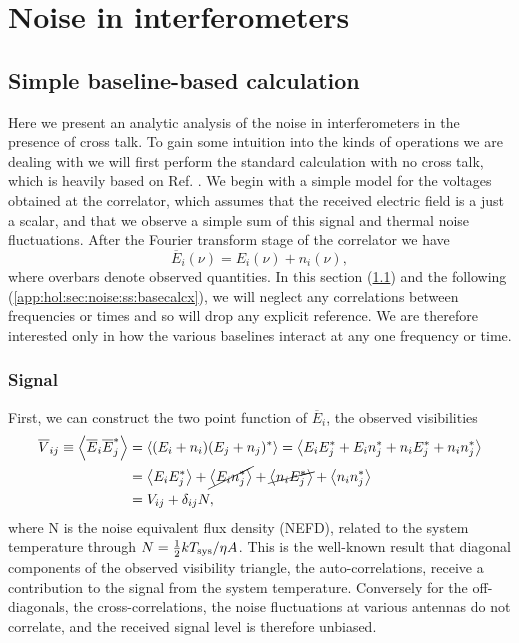 \section{Noise in interferometers}
\label{app:hol:sec:noise}

\subsection{Simple baseline-based calculation} 
\label{app:hol:sec:noise:ss:basecalc}

Here we present an analytic analysis of the noise in interferometers in the presence of cross talk. To gain some intuition into the kinds of operations we are dealing with we will first perform the standard calculation with no cross talk, which is heavily based on Ref. \citep{kulkarni}. We begin with a simple model for the voltages obtained at the correlator, which assumes that the received electric field is a just a scalar, and that we observe a simple sum of this signal and thermal noise fluctuations. After the Fourier transform stage of the correlator we have
\begin{equation}
\overline{E}_i(\nu) = E_i(\nu)+ n_i(\nu),
\end{equation}
where overbars denote observed quantities. In this section (\ref{app:hol:sec:noise:ss:basecalc}) and the following (\ref{app:hol:sec:noise:ss:basecalcx}), we will neglect any correlations between frequencies or times and so will drop any explicit reference. We are therefore interested only in how the various baselines interact at any one frequency or time. %
\subsubsection{Signal}
First, we can construct the two point function of $\overline{E}_i$, the observed visibilities
\begin{align}
\overline{V}_{ij} \equiv \left\langle \overline{E}_i \overline{E}_j^* \right\rangle &= \left\langle (E_i + n_i)(E_j + n_j)^* \right\rangle = \left\langle E_iE_j^* + E_in_j^* + n_iE_j^* + n_in_j^*\right\rangle \nonumber \\ 
&= \left\langle E_iE_j^* \right\rangle + \cancel{\left\langle E_in_j^* \right\rangle} + \cancel{\left\langle n_iE_j^*\right\rangle} +\left\langle n_in_j^* \right\rangle
\nonumber \\ 
&= V_{ij} + \delta_{ij} N, \label{obsvis}
\end{align}
where N is the noise equivalent flux density (NEFD), related to the system temperature through $N=\frac{1}{2}kT_{\rm sys} / \eta A$. This is the well-known result that diagonal components of the observed visibility triangle, the auto-correlations, receive a contribution to the signal from the system temperature. Conversely for the off-diagonals, the cross-correlations, the noise fluctuations at various antennas do not correlate, and the received signal level is therefore unbiased.
